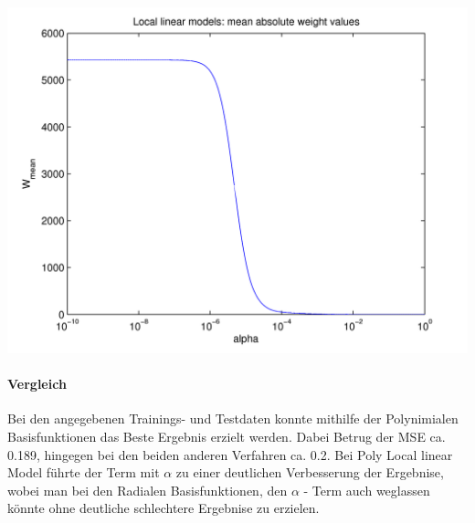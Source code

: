   \begin{center}
	\includegraphics[width=15cm]{figures/114/local_meanweight.png}
	\label{fig:local_meanweight}
  \end{center}


\paragraph{Vergleich}

Bei den angegebenen Trainings- und Testdaten konnte mithilfe der Polynimialen Basisfunktionen das Beste
Ergebnis erzielt werden. Dabei Betrug der MSE ca. 0.189, hingegen bei den beiden anderen Verfahren ca. 0.2.
Bei Poly Local linear Model führte der Term mit $\alpha$ zu einer deutlichen Verbesserung der Ergebnise, wobei
man bei den Radialen Basisfunktionen, den $\alpha$ - Term auch weglassen könnte ohne deutliche schlechtere
Ergebnise zu erzielen.
